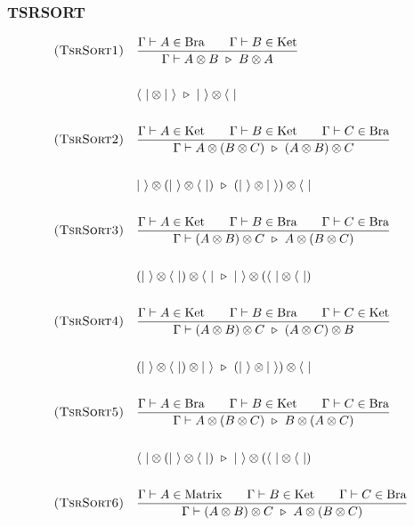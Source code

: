 \subsubsection*{\textsf{TSRSORT}}
\begin{align*}
  & \textsc{(TsrSort1)} &&
  \frac{\Gamma \vdash A \in \textrm{Bra} \qquad \Gamma \vdash B \in \textrm{Ket}}{\Gamma \vdash A \otimes B \reduce B \otimes A} \\
  \\
  & && \<\ | \otimes |\ \> \reduce |\ \> \otimes \<\ | \\
  \\
  & \textsc{(TsrSort2)} &&
  \frac{\Gamma \vdash A \in \textrm{Ket} \qquad \Gamma \vdash B \in \textrm{Ket} \qquad \Gamma \vdash C \in \textrm{Bra}}{\Gamma \vdash A \otimes (B \otimes C) \reduce (A \otimes B) \otimes C} \\
  \\
  & && |\ \> \otimes (|\ \> \otimes \<\ |) \reduce (|\ \> \otimes |\ \>) \otimes \<\ | \\
  \\
  & \textsc{(TsrSort3)} &&
  \frac{\Gamma \vdash A \in \textrm{Ket} \qquad \Gamma \vdash B \in \textrm{Bra} \qquad \Gamma \vdash C \in \textrm{Bra}}{\Gamma \vdash (A \otimes B) \otimes C \reduce A \otimes (B \otimes C)} \\
  \\
  & && (|\ \> \otimes \<\ |) \otimes \<\ | \reduce |\ \> \otimes (\<\ | \otimes \<\ |) \\
  \\
  & \textsc{(TsrSort4)} &&
  \frac{\Gamma \vdash A \in \textrm{Ket} \qquad \Gamma \vdash B \in \textrm{Bra} \qquad \Gamma \vdash C \in \textrm{Ket}}{\Gamma \vdash (A \otimes B) \otimes C \reduce (A \otimes C) \otimes B} \\
  \\
  & && (|\ \> \otimes \<\ |) \otimes |\ \> \reduce (|\ \> \otimes |\ \>) \otimes \<\ | \\
  \\
  & \textsc{(TsrSort5)} &&
  \frac{\Gamma \vdash A \in \textrm{Bra} \qquad \Gamma \vdash B \in \textrm{Ket} \qquad \Gamma \vdash C \in \textrm{Bra}}{\Gamma \vdash A \otimes (B \otimes C) \reduce B \otimes (A \otimes C)} \\
  \\
  & && \<\ | \otimes (|\ \> \otimes \<\ |) \reduce |\ \> \otimes (\<\ | \otimes \<\ |) \\
  \\
  & \textsc{(TsrSort6)} &&
  \frac{\Gamma \vdash A \in \textrm{Matrix} \qquad \Gamma \vdash B \in \textrm{Ket} \qquad \Gamma \vdash C \in \textrm{Bra}}{\Gamma \vdash (A \otimes B) \otimes C \reduce A \otimes (B \otimes C)} \\

\end{align*}
